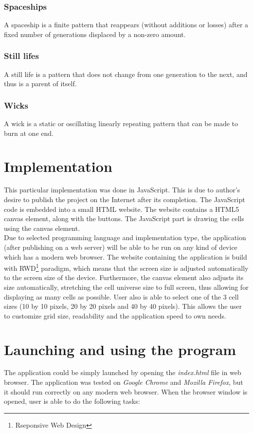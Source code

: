 \documentclass[11pt,a4paper]{article}
\begin{document}
\subsubsection{Spaceships}
A spaceship is a finite pattern that reappears (without additions or losses) after a fixed number of generations displaced by a non-zero amount.

\subsubsection{Still lifes}
A still life is a pattern that does not change from one generation to the next, and thus is a parent of itself.

\subsubsection{Wicks}
A wick is a static or oscillating linearly repeating pattern that can be made to burn at one end.

\newpage
\section{Implementation}
This particular implementation was done in JavaScript. This is due to author's desire to publish the project on the Internet after its completion. The JavaScript code is embedded into a small HTML website. The website contains a HTML5 canvas element, along with the buttons. The JavaScript part is drawing the cells using the canvas element.\\

Due to selected programming language and implementation type, the application (after publishing on a web server) will be able to be run on any kind of device which has a modern web browser. The website containing the application is build with RWD\footnote{Rseponsive Web Design} paradigm, which means that the screen size is adjusted automatically to the screen size of the device. Furthermore, the canvas element also adjusts its size automatically, stretching the cell universe size to full screen, thus allowing for displaying as many cells as possible. User also is able to select one of the 3 cell sizes (10 by 10 pixels, 20 by 20 pixels and 40 by 40 pixels). This allows the user to customize grid size, readability and the application speed to own needs.

\section{Launching and using the program}
The application could be simply launched by opening the \textit{index.html} file in web browser. The application was tested on \textit{Google Chrome} and \textit{Mozilla Firefox}, but it should run correctly on any modern web browser. When the browser window is opened, user is able to do the following tasks:
\end{document}
